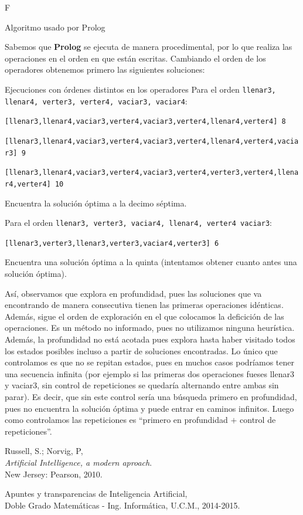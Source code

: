F\documentclass[11pt, a4paper, spanish, openright, twoside]{book}
\begin{document}
	\begin{section}{Algoritmo usado por Prolog}

		Sabemos que \textbf{Prolog} se ejecuta de manera procedimental, por lo que realiza las operaciones en el orden en que están escritas. Cambiando el orden de los operadores obtenemos primero las siguientes soluciones:

		\begin{subsection}{Ejecuciones con órdenes distintos en los operadores}
			Para el orden \texttt{llenar3, llenar4, verter3, verter4, vaciar3, vaciar4}:

			\texttt{[llenar3,llenar4,vaciar3,verter4,vaciar3,verter4,llenar4,verter4] 8}
         
			\texttt{[llenar3,llenar4,vaciar3,verter4,vaciar3,verter4,llenar4,verter4,vaciar3] 9}
			
      \texttt{[llenar3,llenar4,vaciar3,verter4,vaciar3,verter4,verter3,verter4,llenar4,verter4] 10}
			
			Encuentra la solución óptima a la decimo séptima.

			Para el orden \texttt{llenar3, verter3, vaciar4, llenar4, verter4 vaciar3}:
			
			\texttt{[llenar3,verter3,llenar3,verter3,vaciar4,verter3]  6}
         
      Encuentra una solución óptima a la quinta (intentamos obtener cuanto antes una solución óptima).
			
		\end{subsection}

		Así, observamos que explora en profundidad, pues las soluciones que va encontrando de manera consecutiva tienen las primeras operaciones idénticas. Además, 
		sigue el orden de exploración en el que colocamos la deficición de las operaciones. Es un método no informado, pues no utilizamos ninguna heurística. Además, la profundidad no está acotada 
		pues explora hasta haber visitado todos los estados posibles incluso a partir de soluciones encontradas. Lo único que controlamos es que no se repitan estados, pues en muchos casos podríamos tener una secuencia infinita (por ejemplo si las primeras dos operaciones fueses llenar3 y vaciar3, sin control de repeticiones se quedaría alternando entre ambas sin parar). Es decir, que sin este control sería una búsqueda 
		primero en profundidad, pues no encuentra la solución óptima y puede entrar en caminos infinitos. Luego como controlamos las repeticiones es ``primero en profundidad $+$ control de repeticiones''.

	
	\end{section}

	
\begin{thebibliography}{9}

	Russell, S.; Norvig, P, \\
	\emph{Artificial Intelligence, a modern aproach}.\\
	New Jersey: Pearson, 2010.
	
	Apuntes y transparencias de Inteligencia Artificial, \\
	Doble Grado Matemáticas - Ing. Informática, U.C.M., 2014-2015.

\end{thebibliography}
\end{document}
